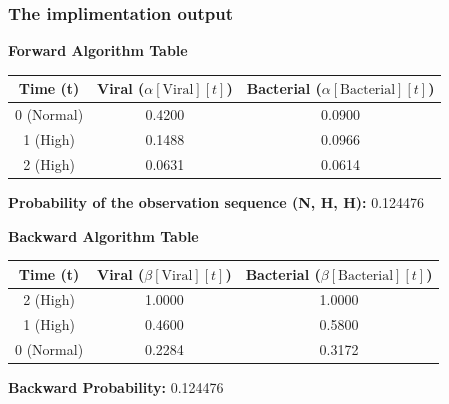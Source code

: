 \documentclass{article}
\begin{document}
\subsubsection*{The implimentation output}
\textbf{Forward Algorithm Table}
\begin{table}[H]
\centering
\begin{tabular}{|c|c|c|}
\hline
\textbf{Time (t)} & \textbf{Viral (\(\alpha[\text{Viral}][t]\))} & \textbf{Bacterial (\(\alpha[\text{Bacterial}][t]\))} \\ \hline
0 (Normal)        & 0.4200                                      & 0.0900                                           \\ \hline
1 (High)          & 0.1488                                      & 0.0966                                           \\ \hline
2 (High)          & 0.0631                                      & 0.0614                                           \\ \hline
\end{tabular}
\end{table}

\noindent
\textbf{Probability of the observation sequence (N, H, H):} 0.124476

\textbf{Backward Algorithm Table}
\begin{table}[H]
\centering
\begin{tabular}{|c|c|c|}
\hline
\textbf{Time (t)} & \textbf{Viral (\(\beta[\text{Viral}][t]\))} & \textbf{Bacterial (\(\beta[\text{Bacterial}][t]\))} \\ \hline
2 (High)          & 1.0000                                      & 1.0000                                           \\ \hline
1 (High)          & 0.4600                                      & 0.5800                                           \\ \hline
0 (Normal)        & 0.2284                                      & 0.3172                                           \\ \hline
\end{tabular}
\end{table}

\noindent
\textbf{Backward Probability:} 0.124476



\clearpage
\end{document}
